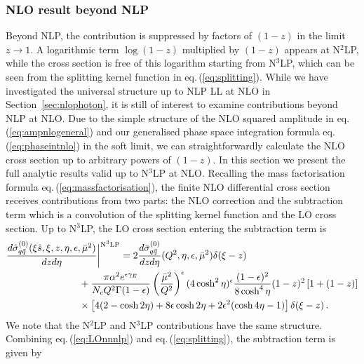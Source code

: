\documentclass[11pt]{article}
\newcommand\eqn[1]     {eq.\,(\ref{#1})}
\begin{document}
\subsubsection{NLO result beyond NLP}
\label{beyondNLP}
Beyond NLP, the contribution is suppressed by factors of $(1-z)$ in the limit $z \to 1$. A logarithmic term $\log(1-z)$ multiplied by $(1-z)$ appears at N$^2$LP, while the cross section is free of this logarithm starting from N$^3$LP, which can be seen from the splitting kernel function in \eqn{eq:splitting}. While we have investigated the universal structure up to NLP LL at NLO in Section~\ref{sec:nlophoton}, it is still of interest to examine contributions beyond NLP at NLO. 
Due to the simple structure of the NLO squared amplitude in \eqn{eq:ampnlogeneral} and our generalised phase space integration formula \eqn{eq:phaseintnlo} in the soft limit, we can straightforwardly calculate the NLO cross section up to arbitrary powers of $(1-z)$. In this section we present the full analytic results valid up to N$^3$LP at NLO. Recalling the mass factorisation formula \eqn{eq:massfactorisation}, the finite NLO differential cross section receives contributions from two parts: the NLO correction and the subtraction term which is a convolution of the splitting kernel function and the LO cross section. Up to N$^3$LP, the LO cross section entering the subtraction term is
\begin{align}\label{eq:LOnnnlp}
   \frac{d\hat{\sigma}_{q\bar{q}}^{(0)}(\xi\hat{s},\xi,z,\eta,\epsilon,\bar\mu^2)}{dzd\eta}\bigg|^{\text{N}^3\text{LP}}
   &=2\frac{d\bar{\sigma}^{(0)}_{q\bar{q}}}{dzd\eta}(Q^2,\eta,\epsilon,\bar\mu^2)\delta(\xi-z) \nonumber \\ &\hspace{-1.5cm}+\frac{\pi\alpha^2e^{\epsilon\gamma_E}}{N_c Q^2\Gamma(1-\epsilon)}\left(\frac{\bar\mu^2}{Q^2}\right)^{\epsilon}(4\cosh^2\eta)^{\epsilon} \frac{(1-\epsilon)^2}{8\cosh^4\eta}(1-z)^2\left[1+(1-z)\right] \nonumber \\
    &\hspace{-1.5cm}\times\left[4(2-\cosh2\eta)+8\epsilon\cosh2\eta+2\epsilon^2(\cosh4\eta-1)\right]\delta(\xi-z)\,.
\end{align}
We note that the N$^2$LP and N$^3$LP contributions have the same structure. Combining \eqn{eq:LOnnnlp} and \eqn{eq:splitting}, the subtraction term is given by
\end{document}
